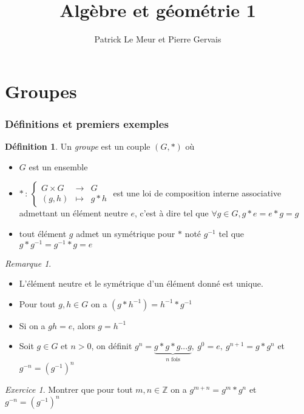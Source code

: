 \documentclass[]{article}
\title{Algèbre et géométrie 1}
\author{Patrick Le Meur et Pierre Gervais}
\theoremstyle{remark}
\newtheorem{myrem}{Remarque}
\newtheorem{myexer}{Exercice}
\theoremstyle{definition}
\newtheorem{mydef}{Définition}
\newcommand{\func}[5]{
#1 \, : \, \left\{ \begin{array}{lcl}
	#2 & \longrightarrow & #3 \\
	#4 & \longmapsto & #5
\end{array}
\right.
}
\begin{document}
\maketitle

\tableofcontents

\part{Groupes}

\section{Définitions et premiers exemples}

\begin{mydef}
	Un \textit{groupe} est un couple $(G, *)$ où
	\begin{itemize}
		\item $G$ est un ensemble
		\item $\func{*}{G \times G}{G}{(g,h)}{g*h}$ est une loi de composition interne associative admettant un élément neutre $e$, c'est à dire tel que $\forall g \in G, g * e = e * g = g$
		\item tout élément $g$ admet un symétrique pour $*$ noté $g^{-1}$ tel que $g*g^{-1}=g^{-1}*g=e$
	\end{itemize}
\end{mydef}

\begin{myrem}
\leavevmode
\begin{itemize}
	\item L'élément neutre et le symétrique d'un élément donné est unique.
	\item Pour tout $g, h \in G$ on a $(g*h^{-1})=h^{-1}*g^{-1}$
	\item Si on a $gh=e$, alors $g=h^{-1}$
	\item Soit $g \in G$ et $n > 0$, on définit $g^n=\underbrace{g*g*g...g}_{n \text{ fois}}, ~ g^0=e, ~ g^{n+1}=g*g^n$ et $g^{-n}=\left(g^{-1}\right)^{n}$
\end{itemize}
\end{myrem}

\begin{myexer}
Montrer que pour tout $m, n \in \mathbb{Z}$ on a $g^{m+n}=g^m*g^n$ et $g^{-n}=\left(g^{-1}\right)^n$
\end{myexer}
\end{document}
